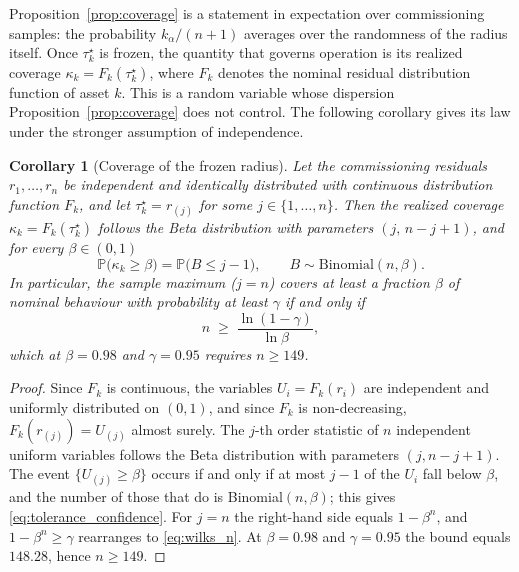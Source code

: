 \documentclass[a4paper]{cas-sc}
\newenvironment{reviewadded}{\par\color{blue}}{\par}
\newtheorem{corollary}{Corollary}
\newcommand{\residual}{\ensuremath{r}}
\newcommand{\Prob}{\ensuremath{\mathbb{P}}}
\begin{document}
\begin{reviewadded}
Proposition~\ref{prop:coverage} is a statement in expectation over
commissioning samples: the probability \(k_\alpha/(n+1)\) averages over the
randomness of the radius itself. Once \(\tau_k^\star\) is frozen, the quantity
that governs operation is its realized coverage \(\kappa_k=F_k(\tau_k^\star)\), where
\(F_k\) denotes the nominal residual distribution function of asset \(k\).
This is a random variable whose dispersion Proposition~\ref{prop:coverage}
does not control. The following corollary gives its law under the stronger
assumption of independence.

\begin{corollary}[Coverage of the frozen radius]
\label{cor:tolerance}
Let the commissioning residuals \(\residual_1,\ldots,\residual_n\) be
independent and identically distributed with continuous distribution function
\(F_k\), and let \(\tau_k^\star=\residual_{(j)}\) for some
\(j\in\{1,\ldots,n\}\). Then the realized coverage
\(\kappa_k=F_k(\tau_k^\star)\) follows the Beta distribution with parameters
\((j,\,n-j+1)\), and for every \(\beta\in(0,1)\)
\begin{equation}
\Prob\bigl(\kappa_k\ge\beta\bigr)=\Prob\bigl(B\le j-1\bigr),
\qquad B\sim\mathrm{Binomial}(n,\beta).
\label{eq:tolerance_confidence}
\end{equation}
In particular, the sample maximum (\(j=n\)) covers at least a fraction
\(\beta\) of nominal behaviour with probability at least \(\gamma\) if and
only if
\begin{equation}
n\;\ge\;\frac{\ln(1-\gamma)}{\ln\beta},
\label{eq:wilks_n}
\end{equation}
which at \(\beta=0.98\) and \(\gamma=0.95\) requires \(n\ge 149\).
\end{corollary}

\begin{proof}
Since \(F_k\) is continuous, the variables \(U_i=F_k(\residual_i)\) are
independent and uniformly distributed on \((0,1)\), and since \(F_k\) is
non-decreasing, \(F_k(\residual_{(j)})=U_{(j)}\) almost surely. The \(j\)-th
order statistic of \(n\) independent uniform variables follows the Beta
distribution with parameters \((j,n-j+1)\). The event \(\{U_{(j)}\ge\beta\}\)
occurs if and only if at most \(j-1\) of the \(U_i\) fall below \(\beta\), and
the number of those that do is Binomial\((n,\beta)\); this gives
\eqref{eq:tolerance_confidence}. For \(j=n\) the right-hand side equals
\(1-\beta^n\), and \(1-\beta^n\ge\gamma\) rearranges to \eqref{eq:wilks_n}. At
\(\beta=0.98\) and \(\gamma=0.95\) the bound equals \(148.28\), hence
\(n\ge149\).
\end{proof}


\end{reviewadded}
\end{document}
